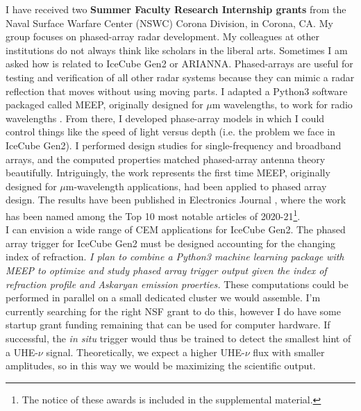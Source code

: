\documentclass[../../../main.tex]{subfiles}
\begin{document}
I have received two \textbf{Summer Faculty Research Internship grants} from the Naval Surface Warfare Center (NSWC) Corona Division, in Corona, CA.  My group focuses on phased-array radar development.  My colleagues at other institutions do not always think like scholars in the liberal arts.  Sometimes I am asked how is related to IceCube Gen2 or ARIANNA.  Phased-arrays are useful for testing and verification of all other radar systems because they can mimic a radar reflection that moves without using moving parts.  I adapted a Python3 software packaged called MEEP, originally designed for $\mu$m wavelengths, to work for radio wavelengths \cite{10.1016/j.cpc.2009.11.008}.  From there, I developed phase-array models in which I could control things like the speed of light versus depth (i.e. the problem we face in IceCube Gen2).  I performed design studies for single-frequency and broadband arrays, and the computed properties matched phased-array antenna theory beautifully.  Intriguingly, the work represents the first time MEEP, originally designed for $\mu$m-wavelength applications, had been applied to phased array design.  The results have been published in Electronics Journal \cite{electronics10040415}, where the work has been named among the Top 10 most notable articles of 2020-21\footnote{The notice of these awards is included in the supplemental material.}.
\\
\vspace{0.25cm}
I can envision a wide range of CEM applications for IceCube Gen2.  The phased array trigger for IceCube Gen2 must be designed accounting for the changing index of refraction.  \textit{I plan to combine a Python3 machine learning package with MEEP to optimize and study phased array trigger output given the index of refraction profile and Askaryan emission proerties.}  These computations could be performed in parallel on a small dedicated cluster we would assemble.  I'm currently searching for the right NSF grant to do this, however I do have some startup grant funding remaining that can be used for computer hardware.  If successful, the \textit{in situ} trigger would thus be trained to detect the smallest hint of a UHE-$\nu$ signal.  Theoretically, we expect a higher UHE-$\nu$ flux with smaller amplitudes, so in this way we would be maximizing the scientific output.
\\
\vspace{0.25cm}
\end{document}
